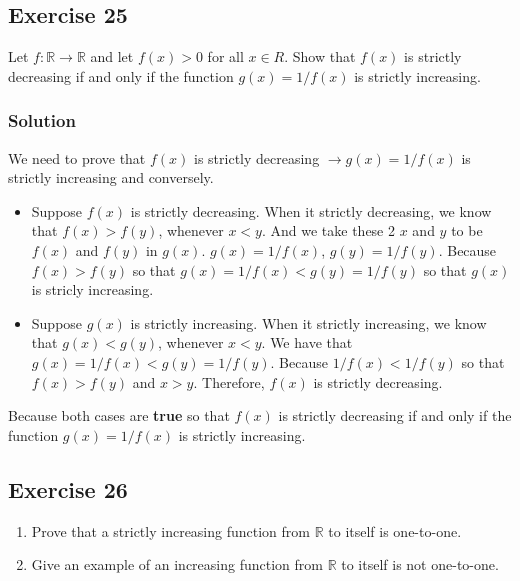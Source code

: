 \documentclass{article}
\theoremstyle{mytheoremstyle}
\theoremstyle{mytheoremstyle}
\theoremstyle{myproblemstyle}
\begin{document}
    \subsection*{Exercise 25}
    Let \(f:\mathbb{R}\to\mathbb{R}\) and let \(f(x) > 0\) for all \(x \in R\). Show that \(f(x)\) is strictly decreasing if and only if the function \(g(x) = 1/f(x)\) is strictly increasing.
    \subsubsection*{Solution}
        We need to prove that \(f(x)\) is strictly decreasing \(\to g(x) = 1/f(x)\) is strictly increasing and conversely.
        \begin{itemize}
            \item Suppose \(f(x)\) is strictly decreasing. When it strictly decreasing, we know that \(f(x) > f(y)\), whenever \(x < y\). And we take these 2 \(x\) and \(y\) to 
            be \(f(x)\) and \(f(y)\) in \(g(x)\). \(g(x) = 1/f(x)\), \(g(y) = 1/f(y)\). Because \(f(x) > f(y)\) so that \(g(x) = 1/f(x) < g(y) = 1/f(y)\) so that \(g(x)\) is stricly increasing.
            \item Suppose \(g(x)\) is strictly increasing. When it strictly increasing, we know that \(g(x) < g(y)\), whenever \(x < y\). We have that \(g(x) = 1/f(x) < g(y) = 1/f(y)\). Because
            \(1/f(x) < 1/f(y)\) so that \(f(x) > f(y)\) and \(x > y\). Therefore, \(f(x)\) is strictly decreasing.
        \end{itemize}
        Because both cases are \textbf{true} so that \(f(x)\) is strictly decreasing if and only if the function \(g(x) = 1/f(x)\) is strictly increasing.
    \subsection*{Exercise 26}
        \begin{enumerate} [label = (\alph*)]
            \item Prove that a strictly increasing function from \(\mathbb{R}\) to itself is one-to-one.
            \item Give an example of an increasing function from \(\mathbb{R}\) to itself is not one-to-one.
        \end{enumerate}
\end{document}
